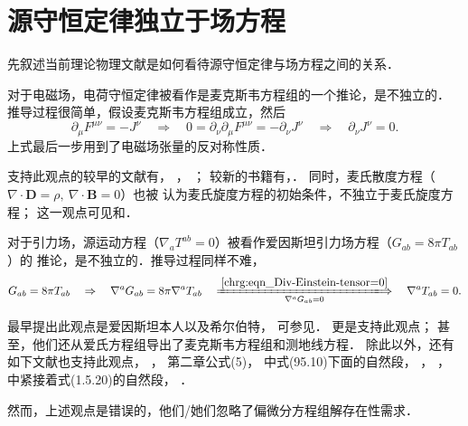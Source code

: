 
\section{源守恒定律独立于场方程}\label{chfd:sec_liu2018}
先叙述当前理论物理文献是如何看待源守恒定律与场方程之间的关系．

对于电磁场，电荷守恒定律被看作是麦克斯韦方程组的一个推论，是不独立的．
推导过程很简单，假设麦克斯韦方程组成立，然后
\begin{equation}
    \partial_\mu F^{\mu\nu} = -J^\nu \quad \Rightarrow \quad
    0=\partial_\nu\partial_\mu F^{\mu\nu} = -\partial_\nu J^\nu
    \quad \Rightarrow \quad \partial_\nu J^\nu =0.
\end{equation}
上式最后一步用到了电磁场张量的反对称性质．

支持此观点的较早的文献有\textcite[\S 30]{landau_2-classical-fields}，
\textcite[\S 18.1-18.3]{feynman-2006-v2}，
\textcite[\S 24]{pauli-1973-ED}；
较新的书籍有\textcite[p.3]{jackson1998}，\textcite[\S 8.1]{griffiths-2023}．
同时，麦氏散度方程（$\nabla\cdot \boldsymbol{D}=\rho,\ \nabla \cdot \boldsymbol{B}=0$）也被
认为麦氏旋度方程的初始条件，不独立于麦氏旋度方程；
这一观点可见\textcite[p.6]{stratton1941}和\textcite[p.603]{courant_hilbert-v2}．




对于引力场，源运动方程（$\nabla_a T^{ab}=0$）被看作爱因斯坦引力场方程（$G_{ab}=8\pi T_{ab}$）的
推论，是不独立的．推导过程同样不难，
\begin{equation}
    G_{ab}=8\pi T_{ab} \quad \Rightarrow \quad
    \nabla^a G_{ab}=8\pi \nabla^a T_{ab}
    \quad \xLongrightarrow[\nabla^a G_{ab}=0]{\ref{chrg:eqn_Div-Einstein-tensor=0}} \quad
    \nabla^a T_{ab}=0 .
\end{equation}

最早提出此观点是爱因斯坦\cite{einstein_infeld_1949}本人以及希尔伯特，
可参见\parencite[\S 15(c)]{Pais-1982}．
\textcite[\S 17.1-17.2]{mtw1973}更是支持此观点；
甚至，他们\cite[\S 20.6]{mtw1973}还从爱氏方程组导出了麦克斯韦方程组和测地线方程．
除此以外，还有如下文献也支持此观点，
\textcite[p.44]{Choquet-Bruhat-2009}，
\textcite{hawking-1966}第二章公式(5)，
\textcite[\S 95]{landau_2-classical-fields}中式(95.10)下面的自然段，
\textcite[\S 5.4]{poisson-will-2014}，
\textcite[\S 6.6]{schutz-2022}，
\textcite[\S 1.5]{weinberg_cos-2008}中紧接着式(1.5.20)的自然段，
\textcite[\S 9.3]{witten-2024}．

然而，上述观点是错误的\cite{liu2018}，他们/她们忽略了偏微分方程组解存在性需求．

